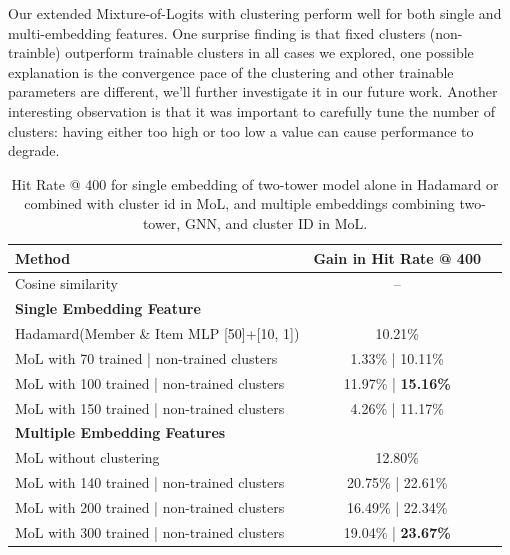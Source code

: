 Our extended Mixture-of-Logits with clustering perform well for both single and multi-embedding features. One surprise finding is that fixed clusters (non-trainble) outperform trainable clusters in all cases we explored, one possible explanation is the convergence pace of the clustering and other trainable parameters are different, we'll further investigate it in our future work. Another interesting observation is that it was important to carefully tune the number of clusters: having either too high or too low a value can cause performance to degrade.
\begin{table}[ht]
\small %
\vspace{-4pt}
\begin{tabular}{lcc}
\hline
\textbf{Method}
& \textbf{Gain in Hit Rate @ 400} \\\hline 
Cosine similarity & --  \\\hline
\textbf{Single Embedding Feature} \\ %
Hadamard(Member \& Item MLP [50]+[10, 1]) & 10.21\% \\
MoL with 70 trained | non-trained clusters & 1.33\% | 10.11\% \\
MoL with 100 trained | non-trained clusters & 11.97\% | \textbf{15.16\%} \\
MoL with 150 trained | non-trained clusters & 4.26\% | 11.17\% \\\hline
\textbf{Multiple Embedding Features} \\ %
MoL without clustering & 12.80\% \\
MoL with 140 trained | non-trained clusters & 20.75\% | 22.61\% \\
MoL with 200 trained | non-trained clusters & 16.49\% | 22.34\% \\
MoL with 300 trained | non-trained clusters & 19.04\% | \textbf{23.67\%} \\\hline


\end{tabular}
\caption{\small Hit Rate @ 400 for single embedding of two-tower model alone in Hadamard or combined with cluster id in MoL, and multiple embeddings combining two-tower, GNN, and cluster ID in MoL.}
\label{table:offline_eval}
\vspace{-16pt}
\end{table}


